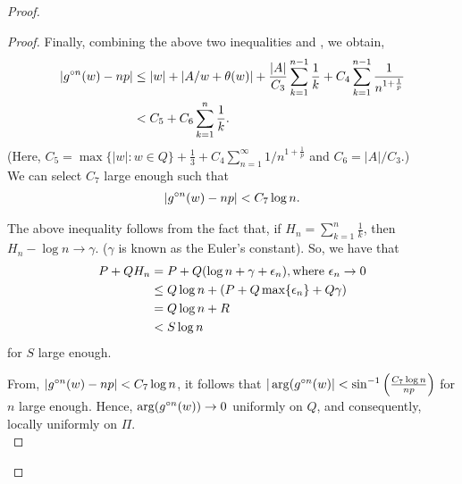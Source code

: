 \begin{proof}
\begin{proof}
Finally, combining the above two inequalities and , we obtain,
\begin{align*}
	|\gog[n](w)-np|&\le |w|+|A /w+\theta (w)|+\frac{|A|}{C_3}\sum_{k=1}^{n-1} \frac{1}{k}+C_4\sum_{k=1}^{n-1} \frac{1}{n^{1+\frac{1}{p}}}\\
				   &< C_5+C_6\sum_{k=1}^{n} \frac{1}{k}
.\end{align*}
(Here, \( C_5=\max\{|w|:w\in Q\}+\frac{1}{3}+C_4\sum_{n=1}^{\infty}  1 /n^{1+\frac{1}{p}} \) and \( C_6=|A| /C_3\).)\\
We can select \( C_7 \) large enough such that
\begin{align}
	|\gog[n](w)-np|<C_7 \log n \label{eqn3.7}
.\end{align}

\begin{remark}
	The above inequality follows from the fact that, if \( H_n=\sum_{k=1}^n \frac{1}{k} \), then \( H_n-\log n\to \gamma \).
	(\( \gamma \) is known as the Euler's constant).
	So, we have that
	\begin{align*}
		P+QH_n &=P+Q(\log n+\gamma +\epsilon_n), \text{where \( \epsilon_n\to 0 \)}\\
			   &\le Q\log n+(P+Q\max\{\epsilon_n\}+Q\gamma)\\
			   &=Q\log n+R\\
			   &<S \log n
	\end{align*} for \( S \) large enough.
\end{remark}

\begin{figure}[ht]
    \centering
    \caption{}
    \label{argogn}
\end{figure}
From, \( |\gog[n](w)-np|<C_7\log n \), it follows that \( |\arg(\gog[n](w)|<\sin ^{-1}\left(\frac{C_7\log n}{np}\right) \)
for \( n \) large enough. Hence, \( \arg(\gog[n](w))\to 0 \) uniformly on \( Q \), and consequently, locally uniformly on \( \Pi \).\\
\vspace{1pt}


\end{proof}
\end{proof}
